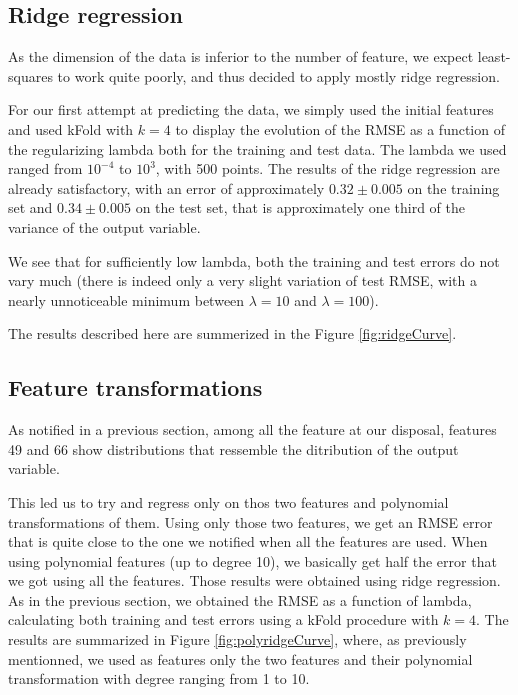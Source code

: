 \documentclass{article} %
\begin{document}
\begin{figure}[!t]
{\label{fig:xhist49}}
\hspace*{0.3in}
\caption{}
\end{figure}

\subsection{Ridge regression}
As the dimension of the data is inferior to the number of feature, we expect
least-squares to work quite poorly, and thus decided to apply mostly ridge
regression.

For our first attempt at predicting the data, we simply used the initial
features and used kFold with $k=4$ to display the evolution of the RMSE as a
function of the regularizing lambda both for the training and test data. 
The lambda we used ranged from $10^{-4}$ to
$10^3$, with 500 points. The results of the ridge regression are already
satisfactory, with an error of approximately $0.32\pm0.005$ on the training set
and $0.34\pm0.005$ on the test set, that is approximately one third of the
variance of the output variable.

We see that for sufficiently low lambda, both the training and test errors do
not vary much (there is indeed only a very slight variation of test RMSE, with a
nearly unnoticeable minimum between $\lambda=10$ and $\lambda=100$).

The results described here are summerized in the Figure \ref{fig:ridgeCurve}.

\subsection{Feature transformations}
As notified in a previous section, among all the feature at our disposal,
features 49 and 66 show distributions that ressemble the ditribution of the
output variable. 

This led us to try and regress only on thos two features and polynomial
transformations of them. Using only those two features, we get an RMSE error
that is quite close to the one we notified when all the features are used. When
using polynomial features (up to degree 10), we basically get half the error
that we got using all the features. Those results were obtained using ridge
regression. As in the previous section, we obtained the RMSE as a function of
lambda, calculating both training and test errors using a kFold procedure with
$k=4$. The results are summarized in Figure \ref{fig:polyridgeCurve}, where, as
previously mentionned, we used as features only the two features and their
polynomial transformation with degree ranging from 1 to 10.
\end{document}
